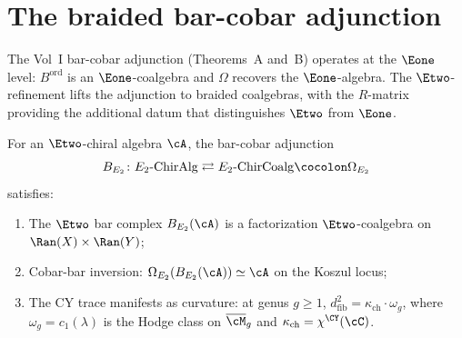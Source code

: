 \section{The braided bar-cobar adjunction}
\label{sec:braided-bar-cobar}

The Vol~I bar-cobar adjunction (Theorems~A and~B) operates at the $\Eone$
level: $B^{\mathrm{ord}}$ is an $\Eone$-coalgebra and $\Omega$ recovers
the $\Eone$-algebra. The $\Etwo$-refinement lifts the adjunction to
braided coalgebras, with the $R$-matrix providing the additional datum
that distinguishes $\Etwo$ from $\Eone$.

\begin{theorem}
\label{thm:e2-bar-cobar}
For an $\Etwo$-chiral algebra $\cA$, the bar-cobar adjunction
\[
 B_{E_2} \colon E_2\text{-}\mathrm{ChirAlg}
 \rightleftarrows E_2\text{-}\mathrm{ChirCoalg}
 \cocolon \Omega_{E_2}
\]
satisfies:
\begin{enumerate}[label=(\roman*)]
 \item The $\Etwo$ bar complex $B_{E_2}(\cA)$ is a factorization
 $\Etwo$-coalgebra on $\Ran(X) \times \Ran(Y)$;
 \item Cobar-bar inversion:
 $\Omega_{E_2}(B_{E_2}(\cA)) \simeq \cA$ on the Koszul locus;
 \item The CY trace manifests as curvature: at genus $g \geq 1$,
 $d_{\mathrm{fib}}^2 = \kappa_{\mathrm{ch}} \cdot \omega_g$,
 where $\omega_g = c_1(\lambda)$ is the Hodge class on
 $\overline{\cM}_g$ and $\kappa_{\mathrm{ch}} = \chi^{\CY}(\cC)$.
\end{enumerate}
\end{theorem}

